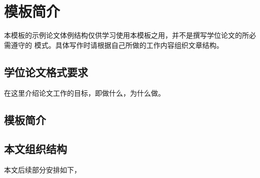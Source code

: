 
\chapter{\texorpdfstring{\XeLaTeX{}}{XeLaTeX}模板简介}
\label{cha:intro}

本模板的示例论文体例结构仅供学习使用本模板之用，并不是撰写学位论文的所必需遵守的
模式。具体写作时请根据自己所做的工作内容组织文章结构。

\section{学位论文格式要求}
\label{sec:motivation}

在这里介绍论文工作的目标，即做什么，为什么做。

\section{\texorpdfstring{\XeLaTeX{}}{XeLaTeX}模板简介}
\label{sec:related-works}

\section{本文组织结构}
\label{sec:organization}

本文后续部分安排如下，


